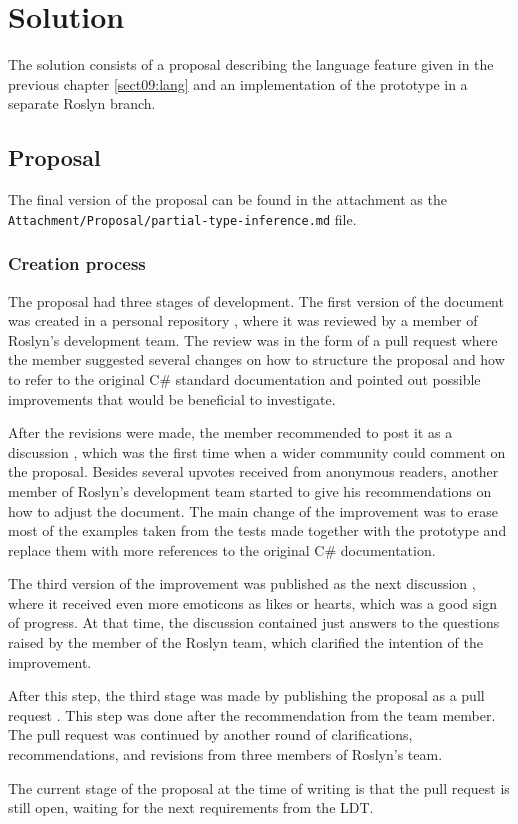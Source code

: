 \chapter{Solution}

The solution consists of a proposal describing the language feature given in the previous chapter \ref{sect09:lang} and an implementation of the prototype in a separate Roslyn branch.

\section{Proposal}

The final version of the proposal can be found in the attachment as the\\ \texttt{Attachment/Proposal/partial-type-inference.md} file.

\subsection{Creation process}

The proposal had three stages of development. 
The first version of the document was created in a personal repository \cite{online:personalRepo}, where it was reviewed by a member of Roslyn's development team. 
The review was in the form of a pull request \cite{online:personalPull} where the member suggested several changes on how to structure the proposal and how to refer to the original C\# standard documentation and pointed out possible improvements that would be beneficial to investigate.
\par
After the revisions were made, the member recommended to post it as a discussion \cite{online:discussion1}, which was the first time when a wider community could comment on the proposal. 
Besides several upvotes received from anonymous readers, another member of Roslyn's development team started to give his recommendations on how to adjust the document. 
The main change of the improvement was to erase most of the examples taken from the tests made together with the prototype and replace them with more references to the original C\# documentation.
\par
The third version of the improvement was published as the next discussion \cite{online:discussion2}, where it received even more emoticons as likes or hearts, which was a good sign of progress. 
At that time, the discussion contained just answers to the questions raised by the member of the Roslyn team, which clarified the intention of the improvement.
\par
After this step, the third stage was made by publishing the proposal as a pull request \cite{online:pull2}. 
This step was done after the recommendation from the team member. 
The pull request was continued by another round of clarifications, recommendations, and revisions from three members of Roslyn's team.
\par
The current stage of the proposal at the time of writing is that the pull
request is still open, waiting for the next requirements from the \ac{LDT}.

